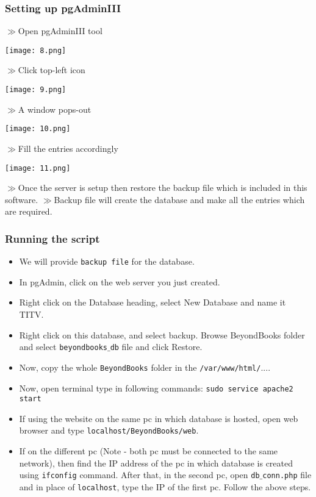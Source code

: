 \documentclass[]{article}
\begin{document}
\subsubsection{Setting up pgAdminIII}
$\gg$Open pgAdminIII tool
\begin{center}\texttt{[image: 8.png]}\end{center}
$\gg$Click top-left icon
\begin{center}\texttt{[image: 9.png]}\end{center}
$\gg$A window pops-out
\begin{center}\texttt{[image: 10.png]}\end{center}
$\gg$Fill the entries accordingly
\begin{center}\texttt{[image: 11.png]}\end{center}
$\gg$Once the server is setup then restore the backup file which is included in this software.
$\gg$Backup file will create the database and make all the entries which are required.
\subsubsection{Running the script}
\begin{itemize}
\item We will provide \texttt{backup file} for the database.
\item In pgAdmin, click on the web server you just created.
\item Right click on the Database heading, select New Database and name it TITV.
\item Right click on this database, and  select backup. Browse BeyondBooks folder and select \texttt{beyondbooks$\_$db} file and click Restore.
\item Now, copy the whole \texttt{BeyondBooks} folder in the \texttt{/var/www/html/$...$}.
\item Now, open terminal type in following commands: \texttt{sudo service apache2 start}
\item If using the website on the same pc in which database is hosted, open web browser and type \texttt{localhost/BeyondBooks/web}.
\item If on the different pc (Note - both pc must be connected to the same network), then find the IP address of the pc in which database is created using \texttt{ifconfig} command. After that, in the second pc, open \texttt{db$\_$conn.php} file and in place of \texttt{localhost}, type the IP of the first pc. Follow the above steps.
\end{itemize}
\end{document}
